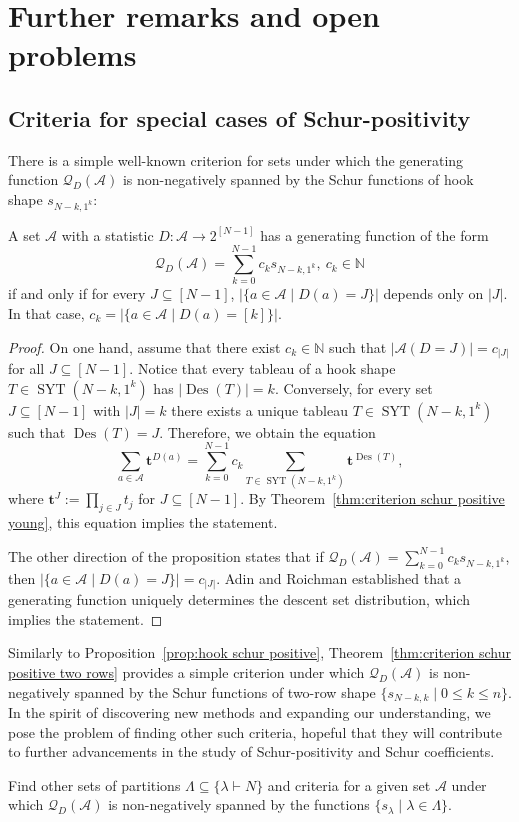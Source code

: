 \documentclass[ALCO]{cedram}
\newcommand{\Des}{\operatorname{Des}}
\newcommand{\Syt}{\operatorname{SYT}}
\newcommand{\NN}{\mathbb{N}}
\newcommand{\Q}{\mathcal{Q}}
\newcommand{\A}{\mathcal{A}}
\begin{document}
\section{Further remarks and open problems}
\label{sec:further research}

\subsection{Criteria for special cases of Schur-positivity}
There is a simple well-known criterion for sets under which the generating function $\Q_{D}(\A)$ is non-negatively spanned by the Schur functions of hook shape $s_{N-k,1^k}$:
\begin{proposition}[folklore]
\label{prop:hook schur positive}
    A set $\A$ with a statistic $D:\A \to 2^{[N-1]}$ has a generating function of the form
    \[
        \Q_{D}(\A) = \sum_{k=0}^{N-1} c_k s_{N-k,1^k},\ c_k \in \NN
    \]
    if and only if for every $J \subseteq [N-1]$, $|\{a \in \A \mid D(a) = J\}|$ depends only on $|J|$. In that case, $c_k = |\{a \in \A \mid D(a) = [k]\}|$.
\end{proposition}

\begin{proof}
    On one hand, assume that there exist $c_k \in \NN$ such that $|\A(D=J)| = c_{|J|}$ for all $J \subseteq [N-1]$. Notice that every tableau of a hook shape $T \in \Syt(N-k,1^k)$ has $|\Des(T)| = k$. Conversely, for every set $J \subseteq [N-1]$ with $|J| = k$ there exists a unique tableau $T \in \Syt(N-k,1^k)$ such that $\Des(T) = J$. Therefore, we obtain the equation
    \[
        \sum_{a \in \A} \boldsymbol{t}^{D(a)} = \sum_{k=0}^{N-1} c_k \sum_{T \in \Syt(N-k,1^k)} \boldsymbol{t}^{\Des(T)},
    \]
    where $\boldsymbol{t}^J := \prod_{j \in J} t_j$ for $J \subseteq [N-1]$.
    By Theorem~\ref{thm:criterion schur positive young}, this equation implies the statement.

    The other direction of the proposition states that if $\Q_{D}(\A) = \sum_{k=0}^{N-1} c_k s_{N-k,1^k}$, then $|\{a \in \A \mid D(a) = J\}| = c_{|J|}$. Adin and Roichman \cite[Corollary 8.1]{adin_roichman_fine_set} established that a generating function uniquely determines the descent set distribution, which implies the statement.
\end{proof}

Similarly to Proposition~\ref{prop:hook schur positive}, Theorem~\ref{thm:criterion schur positive two rows} provides a simple criterion under which $\Q_{D}(\A)$ is non-negatively spanned by the Schur functions of two-row shape $\{s_{N-k,k} \mid 0 \le k \le n\}$.
In the spirit of discovering new methods and expanding our understanding, we pose the problem of finding other such criteria, hopeful that they will contribute to further advancements in the study of Schur-positivity and Schur coefficients.
\begin{problem}
    Find other sets of partitions $\Lambda \subseteq \{\lambda \vdash N\}$ and criteria for a given set $\A$ under which $\Q_{D}(\A)$ is non-negatively spanned by the functions $\{s_\lambda \mid \lambda \in \Lambda\}$.%
\end{problem}
\end{document}

